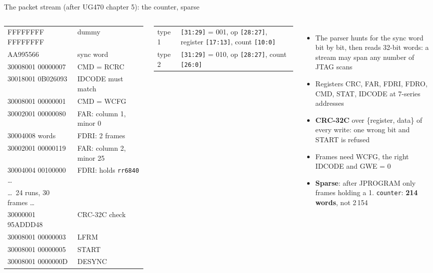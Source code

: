 \documentclass[aspectratio=169,11pt]{beamer}
\begin{document}
\begin{frame}{The packet stream (after UG470 chapter 5): the counter, sparse}
  \begin{columns}[T]
    \ttfamily\scriptsize
    \begin{tabular}{@{}ll@{}}
      FFFFFFFF FFFFFFFF & \sffamily dummy \\
      \textcolor{bobamber}{AA995566} & \textcolor{bobamber}{\sffamily sync word} \\
      30008001 00000007 & \sffamily CMD = RCRC \\
      30018001 \textcolor{bobteal}{0B026093} & \sffamily IDCODE must match \\
      30008001 00000001 & \sffamily CMD = WCFG \\
      30002001 00000080 & \sffamily FAR: column 1, minor 0 \\
      30004008 \sffamily 8 words & \sffamily FDRI: 2 frames \\
      30002001 00000119 & \sffamily FAR: column 2, minor 25 \\
      30004004 00100000 \dots & \sffamily FDRI: holds \texttt{rr6840} \\
      \sffamily \dots\ 24 runs, 30 frames \dots & \\
      30000001 95ADDD48 & \sffamily CRC-32C check \\
      30008001 00000003 & \sffamily LFRM \\
      30008001 00000005 & \sffamily START \\
      30008001 0000000D & \sffamily DESYNC \\
    \end{tabular}

    \vspace{2mm}
    \sffamily\tiny
    \begin{tabular}{@{}ll@{}}
      \toprule
      type 1 & \texttt{[31:29]} = 001, op \texttt{[28:27]}, register \texttt{[17:13]}, count \texttt{[10:0]} \\
      type 2 & \texttt{[31:29]} = 010, op \texttt{[28:27]}, count \texttt{[26:0]} \\
      \bottomrule
    \end{tabular}
    \footnotesize
    \begin{itemize}
      \item The parser \alert{hunts} for the sync word bit by bit, then reads 32-bit words: a stream may span any number of JTAG scans
      \item Registers CRC, FAR, FDRI, FDRO, CMD, STAT, IDCODE at 7-series addresses
      \item \textbf{CRC-32C} over \{register, data\} of every write: one wrong bit and START is refused
      \item Frames need WCFG, the right IDCODE and GWE = 0
      \item \textbf{Sparse}: after JPROGRAM only frames holding a 1. \texttt{counter}: \textbf{214 words}, not 2\,154
    \end{itemize}
  \end{columns}
\end{frame}
\end{document}

